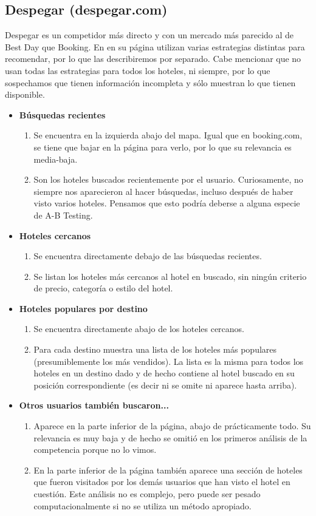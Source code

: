 \documentclass[12pt]{report}
\begin{document}
\subsection*{Despegar (despegar.com)}

Despegar es un competidor más directo y con un mercado más parecido al de Best Day que Booking. En en su página utilizan varias estrategias distintas para recomendar, por lo que las describiremos por separado. Cabe mencionar que no usan todas las estrategias para todos los hoteles, ni siempre, por lo que sospechamos que tienen información incompleta y sólo muestran lo que tienen disponible.
\begin{itemize}
	\item \textbf{Búsquedas recientes}
	\begin{enumerate}
		\item Se encuentra en la izquierda abajo del mapa. Igual que en booking.com, se tiene que bajar en la página para verlo, por lo que su relevancia es media-baja.
		\item Son los hoteles buscados recientemente por el usuario. Curiosamente, no siempre nos aparecieron al hacer búsquedas, incluso después de haber visto varios hoteles. Pensamos que esto podría deberse a alguna especie de A-B Testing.
	\end{enumerate}
	\item \textbf{Hoteles cercanos}
	\begin{enumerate}
		\item Se encuentra directamente debajo de las búsquedas recientes.
		\item Se listan los hoteles más cercanos al hotel en buscado, sin ningún criterio de precio, categoría o estilo del hotel.
	\end{enumerate}
		\item \textbf{Hoteles populares por destino}
	\begin{enumerate}
		\item Se encuentra directamente abajo de los hoteles cercanos.
		\item Para cada destino muestra una lista de los hoteles más populares (presumiblemente los más vendidos). La lista es la misma para todos los hoteles en un destino dado y de hecho contiene al hotel buscado en su posición correspondiente (es decir ni se omite ni aparece hasta arriba).
	\end{enumerate}
	\item \textbf{Otros usuarios también buscaron...}
	\begin{enumerate}
		\item Aparece en la parte inferior de la página, abajo de prácticamente todo. Su relevancia es muy baja y de hecho se omitió en los primeros análisis de la competencia porque no lo vimos.
		\item En la parte inferior de la página también aparece una sección de hoteles que fueron visitados por los demás usuarios que han visto el hotel en cuestión. Este análisis no es complejo, pero puede ser pesado computacionalmente si no se utiliza un  método apropiado.
	\end{enumerate}
\end{itemize}
\end{document}
